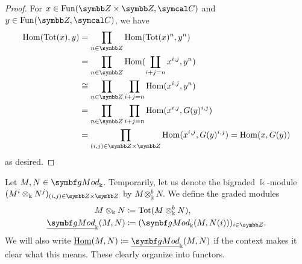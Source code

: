 \begin{proof}
For \(x\in\Fun(\Z\times\Z,\calC)\) and \(y\in\Fun(\Z,\calC)\), we have
\begin{align*}
	\Hom(\Tot(x),y) &= \prod_{n\in\Z}\Hom(\Tot(x)^n,y^n) \\
	&= \prod_{n\in\Z}\Hom(\coprod_{i+j=n}x^{i,j},y^n) \\
	&\cong \prod_{n\in\Z}\prod_{i+j=n}\Hom(x^{i,j},y^n) \\
	&= \prod_{n\in\Z}\prod_{i+j=n}\Hom(x^{i,j},G(y)^{i,j}) \\
	&= \prod_{(i,j)\in\Z\times\Z}\Hom(x^{i,j},G(y)^{i,j}) = \Hom(x,G(y))
\end{align*}
as desired.
\end{proof}

\begin{definition}
	Let \(M,N\in\gMod_\Bbbk\). Temporarily, let us denote the bigraded \(\Bbbk\)-module \((M^i\otimes_\Bbbk N^j)_{(i,j)\in\Z\times\Z}\) by \(M\otimes_\Bbbk^b N\).
	We define the graded modules
	\begin{align*}
		M\otimes_\Bbbk N &\coloneq \Tot(M\otimes_\Bbbk^b N), \\
		\ugMod_\Bbbk(M,N) &\coloneq (\gMod_\Bbbk(M,N(i)))_{i\in \Z}.
	\end{align*}
	We will also write \(\iHom(M,N) \coloneq \ugMod_\Bbbk(M,N)\) if the context makes it clear what this means. These clearly organize into functors.
\end{definition}

